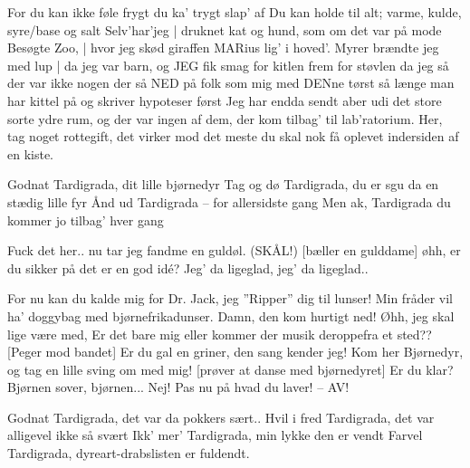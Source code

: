 \documentclass[a4paper,11pt]{article}
\begin{document}
\begin{song}
\scene{[Rap!]}
 For du kan ikke føle frygt
du ka’ trygt slap’ af
Du kan holde til alt;
varme, kulde, syre/base og salt
Selv'har'jeg | druknet kat og hund,
som om det var på mode
Besøgte Zoo, | hvor jeg skød giraffen MARius lig’ i hoved’.
Myrer brændte jeg med lup | da jeg var barn,
og JEG fik smag for kitlen frem for støvlen
da jeg så der var
ikke nogen der så NED på folk som mig med DENne tørst
så længe man har kittel på
og skriver hypoteser først
Jeg har endda sendt aber udi det store
sorte ydre rum,
og der var ingen af dem,
der kom tilbag' til lab'ratorium.
Her, tag noget rottegift, det virker mod det meste
du skal nok få oplevet indersiden af en kiste.

\scene{[Omkvæd]}
 Godnat Tardigrada, dit lille bjørnedyr
Tag og dø Tardigrada, 
du er sgu da en stædig lille fyr
Ånd ud Tardigrada – for allersidste gang
Men ak, Tardigrada du kommer jo tilbag’ hver gang

 Fuck det her.. nu tar jeg fandme en guldøl. (SKÅL!) [bæller en gulddame]
 øhh, er du sikker på det er en god idé?
 Jeg' da ligeglad, jeg' da ligeglad..

For nu kan du kalde mig for Dr. Jack,
jeg ”Ripper” dig til lunser!
Min fråder vil ha' doggybag
med bjørnefrikadunser.
Damn, den kom hurtigt ned!
Øhh, jeg skal lige være med,
Er det bare mig eller kommer der musik deroppefra et sted??
[Peger mod bandet]
Er du gal en griner, den sang kender jeg!
Kom her Bjørnedyr,
og tag en lille sving om med mig!
[prøver at danse med bjørnedyret]
 Er du klar? Bjørnen sover, bjørnen...
 Nej! Pas nu på hvad du laver! – AV!







\scene{[Omkvæd]}
 Godnat Tardigrada,
det var da pokkers sært..
Hvil i fred Tardigrada,
det var alligevel ikke så svært
Ikk’ mer’ Tardigrada, min lykke den er vendt
Farvel Tardigrada, dyreart-drabslisten er fuldendt.
\end{song}
\end{document}
